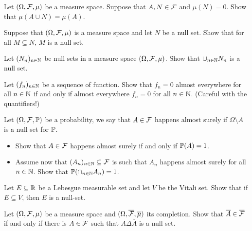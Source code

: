 \begin{problem}
    Let $(\Omega,\mathcal F,\mu)$ be a measure space. Suppose that $A,N\in \mathcal F$ and $\mu(N) =0$. Show that $\mu(A\cup N) = \mu(A)$.
\end{problem}

\begin{problem} Suppose that $(\Omega,\mathcal F,\mu)$ is a measure space and let $N$ be a null set. Show that for all $M\subseteq N$, $M$ is a null set.
\end{problem}
    
 \begin{problem}
    Let $(N_n)_{n\in \mathbb N}$ be null sets in a measure space $(\Omega,\mathcal F,\mu)$. Show that $\cup_{n\in \mathbb N} N_n$ is a null set.
\end{problem}

\begin{problem}
    Let $(f_n)_{n\in \mathbb N}$ be a sequence of function. Show that $f_n = 0$ almost everywhere for all $n\in \mathbb N$ if and only if almost everywhere $f_n=0$ for all $n\in \mathbb N$. (Careful with the quantifiers!)
\end{problem}

\begin{problem} Let $(\Omega,\mathcal F,\mathbb P)$ be a probability, we say that $A\in\mathcal F$ happens almost surely if $\Omega\setminus A$ is a null set for $\mathbb P$.
    \begin{itemize}
        \item Show that $A\in \mathcal F$ happens almost surely if and only if $\mathbb P(A) = 1$.
        \item Assume now that $(A_n)_{n\in \mathbb N}\subseteq \mathcal F$ is such that $A_n$ happens almost surely for all $n\in \mathbb N$. Show that $\mathbb P(\cap_{n\in \mathbb N} A_n) = 1$.
    \end{itemize} 
\end{problem}

\begin{problem}
        Let $E\subseteq \mathbb R$ be a Lebesgue measurable set and let $V$ be the Vitali set. Show that if $E \subseteq V$, then $E$ is a null-set.
\end{problem}

\begin{problem}
    Let $(\Omega,\mathcal F,\mu)$ be a measure space and $(\Omega,\overline{\mathcal F},\overline{\mu})$ its completion. Show that $\overline{A}\in \overline{\mathcal F}$ if and only if there is $A\in \mathcal F$ such that $A\Delta \overline{A}$ is a null set.
\end{problem}

